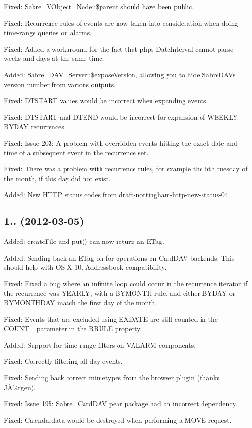 \begin{DoxyItemize}
\item Fixed\+: Sabre\+\_\+\+V\+Object\+\_\+\+Node\+::\$parent should have been public.
\item Fixed\+: Recurrence rules of events are now taken into consideration when doing time-\/range queries on alarms.
\item Fixed\+: Added a workaround for the fact that php\textquotesingle{}s Date\+Interval cannot parse weeks and days at the same time.
\item Added\+: Sabre\+\_\+\+D\+A\+V\+\_\+\+Server\+::\$expose\+Version, allowing you to hide Sabre\+D\+AV\textquotesingle{}s version number from various outputs.
\item Fixed\+: D\+T\+S\+T\+A\+RT values would be incorrect when expanding events.
\item Fixed\+: D\+T\+S\+T\+A\+RT and D\+T\+E\+ND would be incorrect for expansion of W\+E\+E\+K\+LY B\+Y\+D\+AY recurrences.
\item Fixed\+: Issue 203\+: A problem with overridden events hitting the exact date and time of a subsequent event in the recurrence set.
\item Fixed\+: There was a problem with recurrence rules, for example the 5th tuesday of the month, if this day did not exist.
\item Added\+: New H\+T\+TP status codes from draft-\/nottingham-\/http-\/new-\/status-\/04.
\end{DoxyItemize}

\subsection*{1.. (2012-\/03-\/05) }


\begin{DoxyItemize}
\item Added\+: create\+File and put() can now return an E\+Tag.
\item Added\+: Sending back an E\+Tag on for operations on Card\+D\+AV backends. This should help with OS X 10. Addressbook compatibility.
\item Fixed\+: Fixed a bug where an infinite loop could occur in the recurrence iterator if the recurrence was Y\+E\+A\+R\+LY, with a B\+Y\+M\+O\+N\+TH rule, and either B\+Y\+D\+AY or B\+Y\+M\+O\+N\+T\+H\+D\+AY match the first day of the month.
\item Fixed\+: Events that are excluded using E\+X\+D\+A\+TE are still counted in the C\+O\+U\+NT= parameter in the R\+R\+U\+LE property.
\item Added\+: Support for time-\/range filters on V\+A\+L\+A\+RM components.
\item Fixed\+: Correctly filtering all-\/day events.
\item Fixed\+: Sending back correct mimetypes from the browser plugin (thanks JÃ¼rgen).
\item Fixed\+: Issue 195\+: Sabre\+\_\+\+Card\+D\+AV pear package had an incorrect dependency.
\item Fixed\+: Calendardata would be destroyed when performing a M\+O\+VE request.
\end{DoxyItemize}

